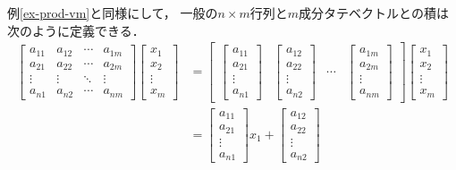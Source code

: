 \documentclass[11pt, a4paper, dvipdfmx]{jsarticle}
\theoremstyle{definition}
\theoremstyle{mystyle}
\numberwithin{equation}{section} %
\begin{document}
例\ref{ex-prod-vm}と同様にして，
一般の$n\times m$行列と$m$成分タテベクトルとの積は
次のように定義できる．
\begin{align*}
    \begin{bmatrix}
        a_{11}&a_{12}&\cdots&a_{1m}\\
        a_{21}&a_{22}&\cdots&a_{2m}\\
        \vdots&\vdots&\ddots&\vdots\\
        a_{n1}&a_{n2}&\cdots&a_{nm}
    \end{bmatrix}\begin{bmatrix}
        x_1\\x_2\\\vdots\\x_m
    \end{bmatrix}
    &=\begin{bmatrix}
        \begin{bmatrix}
           a_{11}\\a_{21}\\\vdots\\a_{n1}
        \end{bmatrix}&\begin{bmatrix}
           a_{12}\\a_{22}\\\vdots\\a_{n2} 
        \end{bmatrix}&\cdots
        &\begin{bmatrix}
           a_{1m}\\a_{2m}\\\vdots\\a_{nm}
        \end{bmatrix}   
    \end{bmatrix}\begin{bmatrix}
        x_1\\x_2\\\vdots\\x_m
    \end{bmatrix}\\
    &=\begin{bmatrix}
        a_{11}\\a_{21}\\\vdots\\a_{n1}
    \end{bmatrix}x_1
    +\begin{bmatrix}
        a_{12}\\a_{22}\\\vdots\\a_{n2} 

\end{bmatrix}
\end{align*}
\end{document}
